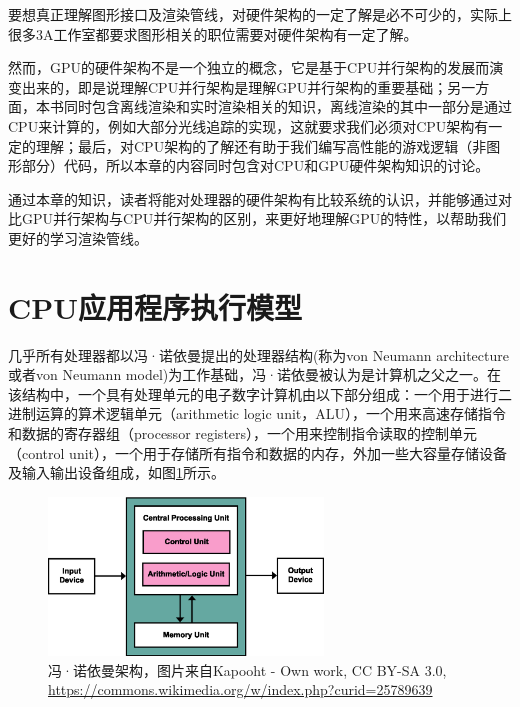 要想真正理解图形接口及渲染管线，对硬件架构的一定了解是必不可少的，实际上很多3A工作室都要求图形相关的职位需要对硬件架构有一定了解。

然而，GPU的硬件架构不是一个独立的概念，它是基于CPU并行架构的发展而演变出来的，即是说理解CPU并行架构是理解GPU并行架构的重要基础；另一方面，本书同时包含离线渲染和实时渲染相关的知识，离线渲染的其中一部分是通过CPU来计算的，例如大部分光线追踪的实现，这就要求我们必须对CPU架构有一定的理解；最后，对CPU架构的了解还有助于我们编写高性能的游戏逻辑（非图形部分）代码，所以本章的内容同时包含对CPU和GPU硬件架构知识的讨论。

通过本章的知识，读者将能对处理器的硬件架构有比较系统的认识，并能够通过对比GPU并行架构与CPU并行架构的区别，来更好地理解GPU的特性，以帮助我们更好的学习渲染管线。




\section{CPU应用程序执行模型}
几乎所有处理器都以冯·诺依曼提出的处理器结构(称为von Neumann architecture或者von Neumann model)为工作基础，冯·诺依曼被认为是计算机之父之一。在该结构中，一个具有处理单元的电子数字计算机由以下部分组成：一个用于进行二进制运算的算术逻辑单元（arithmetic logic unit，ALU），一个用来高速存储指令和数据的寄存器组（processor registers），一个用来控制指令读取的控制单元（control unit），一个用于存储所有指令和数据的内存，外加一些大容量存储设备及输入输出设备组成，如图\ref{f:rp-Neumann-Architecture}所示。

\begin{figure}
\sidecaption
	\includegraphics[width=0.65\textwidth]{figures/rp/Von-Neumann-Architecture}
	\caption{冯·诺依曼架构，图片来自Kapooht - Own work, CC BY-SA 3.0, \protect\url{https://commons.wikimedia.org/w/index.php?curid=25789639}}
	\label{f:rp-Neumann-Architecture}
\end{figure}

